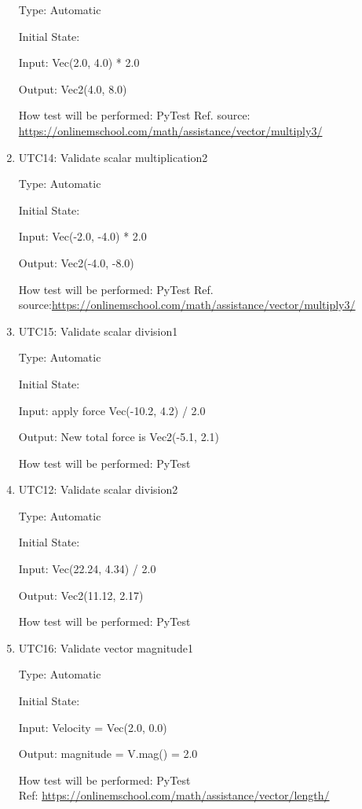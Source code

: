 \documentclass[12pt, titlepage]{article}
\begin{document}
\begin{enumerate}
	Type: Automatic
	
	Initial State: 
	
	Input: Vec(2.0, 4.0) * 2.0
	
	Output: Vec2(4.0, 8.0)
	
	How test will be performed: PyTest
	Ref. source: \url{https://onlinemschool.com/math/assistance/vector/multiply3/}
	
	\item{UTC14}{: Validate scalar multiplication2\\}
	
	Type: Automatic
	
	Initial State: 
	
	Input:  Vec(-2.0, -4.0) * 2.0
	
	Output:  Vec2(-4.0, -8.0)
	
	How test will be performed: PyTest
	Ref. source:\url{https://onlinemschool.com/math/assistance/vector/multiply3/}
	
	\item{UTC15}{: Validate scalar division1\\}
	
	Type: Automatic
	
	Initial State: 
	
	Input: apply force Vec(-10.2, 4.2) / 2.0
	
	Output: New total force is Vec2(-5.1, 2.1)
	
	How test will be performed: PyTest
	
	\item{UTC12}{: Validate scalar division2\\}
	
	Type: Automatic
	
	Initial State: 
	
	Input: Vec(22.24, 4.34) / 2.0
	
	Output: Vec2(11.12, 2.17)
	
	How test will be performed: PyTest
	
	\item{UTC16}{: Validate vector magnitude1\\}
	
	Type: Automatic
	
	Initial State: 
	
	Input: Velocity = Vec(2.0, 0.0)
	
	Output: magnitude = V.mag() = 2.0
	
	How test will be performed: PyTest\\
	Ref: \url{https://onlinemschool.com/math/assistance/vector/length/}
	

\end{enumerate}
\end{document}
